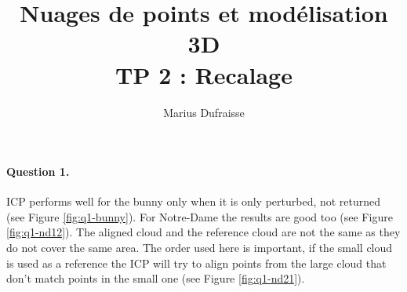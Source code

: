 \documentclass[french]{article}
\begin{document}
\title{Nuages de points et modélisation 3D\\
TP 2 : Recalage}
\author{Marius Dufraisse}
\date{}

\maketitle


\paragraph{Question 1.} 
ICP performs well for the bunny only when it is only perturbed, not returned (see Figure \ref{fig:q1-bunny}). For Notre-Dame the results are good too (see Figure \ref{fig:q1-nd12}). The aligned cloud and the reference cloud are not the same as they do not cover the same area. The order used here is important, if the small cloud is used as a reference the ICP will try to align points from the large cloud that don't match points in the small one (see Figure \ref{fig:q1-nd21}). 
\end{document}
